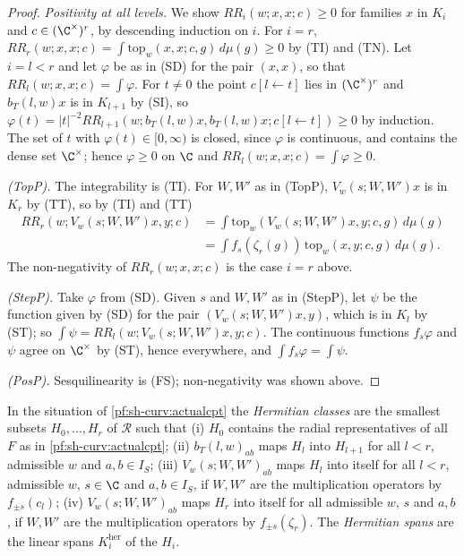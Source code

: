 \begin{proof}
\emph{Positivity at all levels.} We show $RR_i(w;x,x;c)\ge0$ for families $x$ in $K_i$ and $c\in(\C^\times)^r$, by descending
induction on $i$. For $i=r$, $RR_r(w;x,x;c)=\int\mathrm{top}_w(x,x;c,g)\,d\mu(g)\ge0$ by (TI) and (TN). Let $i=l<r$ and let
$\varphi$ be as in (SD) for the pair $(x,x)$, so that $RR_l(w;x,x;c)=\int\varphi$. For $t\ne0$ the point $c[l\leftarrow t]$
lies in $(\C^\times)^r$ and $b_T(l,w)x$ is in $K_{l+1}$ by (SI), so
$\varphi(t)=|t|^{-2}RR_{l+1}(w;b_T(l,w)x,b_T(l,w)x;c[l\leftarrow t])\ge0$ by induction. The set of $t$ with
$\varphi(t)\in[0,\infty)$ is closed, since $\varphi$ is continuous, and contains the dense set $\C^\times$; hence $\varphi\ge0$
on $\C$ and $RR_l(w;x,x;c)=\int\varphi\ge0$.

\emph{(TopP).} The integrability is (TI). For $W,W'$ as in (TopP), $V_w(s;W,W')x$ is in $K_r$ by (TT), so by (TI) and (TT)
\begin{align*}
RR_r(w;V_w(s;W,W')x,y;c)&=\int\mathrm{top}_w(V_w(s;W,W')x,y;c,g)\,d\mu(g)\\
&=\int f_s(\zeta_r(g))\,\mathrm{top}_w(x,y;c,g)\,d\mu(g).
\end{align*}
The non-negativity of $RR_r(w;x,x;c)$ is the case $i=r$ above.

\emph{(StepP).} Take $\varphi$ from (SD). Given $s$ and $W,W'$ as in (StepP), let $\psi$ be the function given by (SD) for the
pair $(V_w(s;W,W')x,y)$, which is in $K_l$ by (ST); so $\int\psi=RR_l(w;V_w(s;W,W')x,y;c)$. The continuous functions $f_s\varphi$
and $\psi$ agree on $\C^\times$ by (ST), hence everywhere, and $\int f_s\varphi=\int\psi$.

\emph{(PosP).} Sesquilinearity is (FS); non-negativity was shown above.
\end{proof}

\begin{definition}\label{pf:sh-curv:herdef}
In the situation of \cref{pf:sh-curv:actualcpt} the \emph{Hermitian classes} are the smallest subsets $H_0,\dots,H_r$ of
$\mathcal R$ such that
(i) $H_0$ contains the radial representatives of all $F$ as in \cref{pf:sh-curv:actualcpt};
(ii) $b_T(l,w)_{ab}$ maps $H_l$ into $H_{l+1}$ for all $l<r$, admissible $w$ and $a,b\in I_S$;
(iii) $V_w(s;W,W')_{ab}$ maps $H_l$ into itself for all $l<r$, admissible $w$, $s\in\C$ and $a,b\in I_S$, if $W,W'$ are the
multiplication operators by $f_{\pm s}(c_l)$;
(iv) $V_w(s;W,W')_{ab}$ maps $H_r$ into itself for all admissible $w$, $s$ and $a,b$, if $W,W'$ are the multiplication
operators by $f_{\pm s}(\zeta_r)$.
The \emph{Hermitian spans} are the linear spans $K^{\mathrm{her}}_i$ of the $H_i$.
\end{definition}

